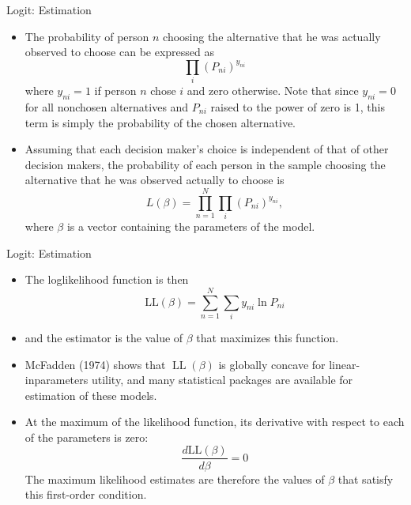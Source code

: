 \begin{frame}{Logit: Estimation}
\begin{itemize}
\item The probability of person $n$ choosing the alternative that he was actually observed to choose can be expressed as
$$
\prod_i\left(P_{n i}\right)^{y_{n i}}
$$
where $y_{n i}=1$ if person $n$ chose $i$ and zero otherwise. Note that since $y_{n i}=0$ for all nonchosen alternatives and $P_{n i}$ raised to the power of zero is 1, this term is simply the probability of the chosen alternative.

\item Assuming that each decision maker's choice is independent of that of other decision makers, the probability of each person in the sample choosing the alternative that he was observed actually to choose is
$$
L(\beta)=\prod_{n=1}^N \prod_i\left(P_{n i}\right)^{y_{n i}},
$$
where $\beta$ is a vector containing the parameters of the model.
\end{itemize}
\end{frame}






\begin{frame}{Logit: Estimation}
\begin{itemize}
\item The loglikelihood function is then
$$
\mathrm{LL}(\beta)=\sum_{n=1}^N \sum_i y_{n i} \ln P_{n i}
$$
\item and the estimator is the value of $\beta$ that maximizes this function.
\item McFadden (1974) shows that $\operatorname{LL}(\beta)$ is globally concave for linear-inparameters utility, and many statistical packages are available for estimation of these models.
\item At the maximum of the likelihood function, its derivative with respect to each of the parameters is zero:
$$
\frac{d \mathrm{LL}(\beta)}{d \beta}=0
$$
The maximum likelihood estimates are therefore the values of $\beta$ that satisfy this first-order condition.
\end{itemize}
\end{frame}










